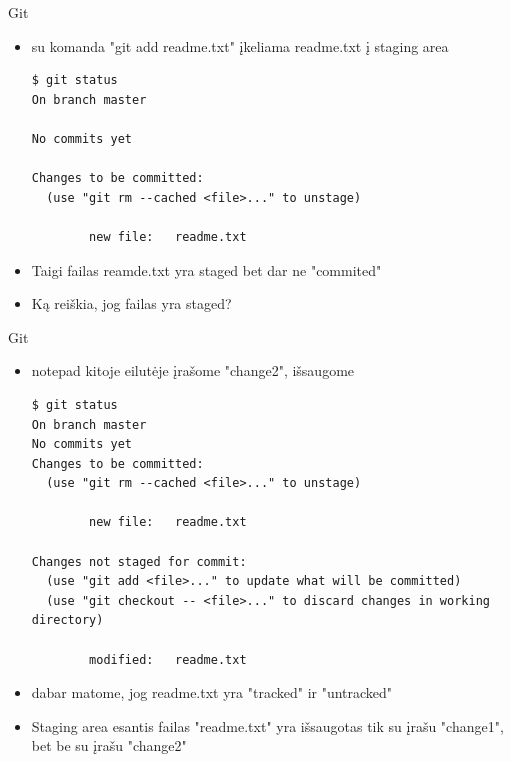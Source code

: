 \documentclass[11pt,xcolor=table]{beamer}
\begin{document}
\begin{frame}[fragile]{Git}
\begin{itemize}
\item su komanda "git add readme.txt" įkeliama readme.txt į staging area
\begin{lstlisting}
$ git status
On branch master

No commits yet

Changes to be committed:
  (use "git rm --cached <file>..." to unstage)

        new file:   readme.txt

\end{lstlisting}
\item Taigi failas reamde.txt yra staged bet dar ne "commited"
\item Ką reiškia, jog failas yra staged?
\end{itemize}
\end{frame}


\begin{frame}[fragile]{Git}
\begin{itemize}
\item notepad kitoje eilutėje įrašome "change2", išsaugome
\begin{lstlisting}
$ git status
On branch master
No commits yet
Changes to be committed:
  (use "git rm --cached <file>..." to unstage)

        new file:   readme.txt

Changes not staged for commit:
  (use "git add <file>..." to update what will be committed)
  (use "git checkout -- <file>..." to discard changes in working directory)

        modified:   readme.txt
\end{lstlisting}
\item dabar matome, jog readme.txt yra "tracked" ir "untracked"
\item Staging area esantis failas "readme.txt" yra išsaugotas tik su įrašu "change1", bet be su įrašu "change2"
\end{itemize}
\end{frame}
\end{document}
